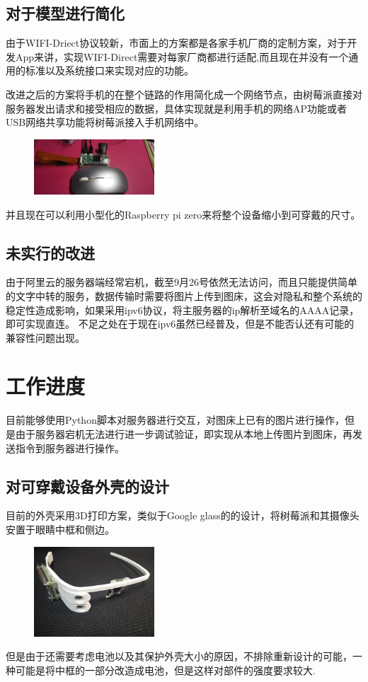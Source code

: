 \documentclass[twocolumn,a4,UTF8]{ctexart}
\begin{document}
	\subsection{对于模型进行简化}
	由于WIFI-Driect协议较新，市面上的方案都是各家手机厂商的定制方案，对于开发App来讲，实现WIFI-Direct需要对每家厂商都进行适配,而且现在并没有一个通用的标准以及系统接口来实现对应的功能。
	
	
	改进之后的方案将手机的在整个链路的作用简化成一个网络节点，由树莓派直接对服务器发出请求和接受相应的数据，具体实现就是利用手机的网络AP功能或者USB网络共享功能将树莓派接入手机网络中。
	\begin{figure}[H] 
	\centering 
	\includegraphics[width=0.4\textwidth]{size.jpg} 
	\end{figure}
	并且现在可以利用小型化的Raspberry pi zero来将整个设备缩小到可穿戴的尺寸。
	\subsection{未实行的改进}
		由于阿里云的服务器端经常宕机，截至9月26号依然无法访问，而且只能提供简单的文字中转的服务，数据传输时需要将图片上传到图床，这会对隐私和整个系统的稳定性造成影响，如果采用ipv6协议，将主服务器的ip解析至域名的AAAA记录，即可实现直连。
		不足之处在于现在ipv6虽然已经普及，但是不能否认还有可能的兼容性问题出现。
	\section{工作进度}
		目前能够使用Python脚本对服务器进行交互，对图床上已有的图片进行操作，但是由于服务器宕机无法进行进一步调试验证，即实现从本地上传图片到图床，再发送指令到服务器进行操作。
		\subsection{对可穿戴设备外壳的设计}
		目前的外壳采用3D打印方案，类似于Google glass的的设计，将树莓派和其摄像头安置于眼睛中框和侧边。
		\begin{figure}[H] 
	\centering 
	\includegraphics[width=0.4\textwidth]{glassfront.jpg} 
	\end{figure}
		但是由于还需要考虑电池以及其保护外壳大小的原因，不排除重新设计的可能，一种可能是将中框的一部分改造成电池，但是这样对部件的强度要求较大.
\end{document}
